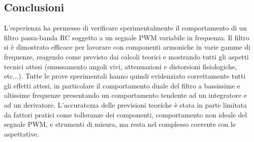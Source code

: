 \documentclass{article}
\begin{document}
  \subsection{Conclusioni}
    L'esperienza ha permesso di verificare sperimentalmente il comportamento di un filtro passa-banda
    RC soggetto a un segnale PWM variabile in frequenza. Il filtro si è dimostrato efficace per lavorare
    con componenti armoniche in varie gamme di frequenze, reagendo come previsto dai calcoli teorici e 
    mostrando tutti gli aspetti tecnici attesi (smussamento angoli vivi, attenuazioni e distorsioni fisiologiche, etc...). 
    Tutte le prove sperimentali hanno quindi evidenziato correttamente tutti gli effetti attesi, in particolare il comportamento
    duale del filtro a bassissime e altissime frequenze presentando un comportamento tendente ad un integratore e ad un derivatore.
    L'accuratezza delle previsioni teoriche è stata in parte limitata da fattori pratici come tolleranze dei componenti, comportamento non ideale
    del segnale PWM, e strumenti di misura, ma resta nel complesso coerente con le aspettative.
\end{document}
